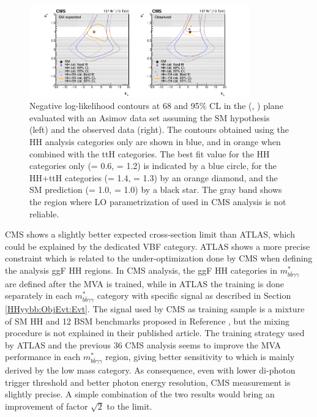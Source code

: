 \begin{figure}[htbp]
    \centering
    \includegraphics[width=0.85\textwidth]{Ch5/Img/CMS-HIG-19-018_kl_LH.pdf}
    \caption{Negative log-likelihood contours at 68 and 95\% CL in the (\kl, \kt) plane evaluated with an Asimov data set assuming the SM hypothesis (left) and the observed data (right). The contours obtained using the HH analysis categories only are shown in blue, and in orange when combined with the ttH categories. The best fit value for the HH categories only (\kl = 0.6, \kt = 1.2) is indicated by a blue circle, for the HH+ttH categories (\kl = 1.4, \kl = 1.3) by an orange diamond, and the SM prediction (\kl = 1.0, \kt = 1.0) by a black star. The gray band shows the region where LO parametrization of \kt used in CMS analysis is not reliable. }
    \label{fig:HHyybb:CMS:LH:2D}
\end{figure}

CMS shows a slightly better expected cross-section limit than ATLAS, which could be explained by the dedicated VBF category. ATLAS shows a more precise \kl constraint which is related to the under-optimization done by CMS when defining the analysis ggF HH regions. In CMS analysis, the ggF HH categories in $m_{b \bar{b} \gamma \gamma}^{*}$ are defined after the MVA is trained, while in ATLAS the training is done separately in each $m_{b \bar{b} \gamma \gamma}^{*}$ category with specific signal as described in Section \ref{HHyybb:ObjEvt:Evt}. The signal used by CMS as training sample is a mixture of SM HH and 12 BSM benchmarks proposed in Reference \cite{CMS_BSM}, but the mixing procedure is not explained in their published article. The training strategy used by ATLAS and the previous 36 \ifb CMS analysis seems to improve the MVA performance in each $m_{b \bar{b} \gamma \gamma}^{*}$ region, giving better sensitivity to \kl which is mainly derived by the low mass category. As consequence, even with lower di-photon trigger threshold and better photon energy resolution, CMS measurement is slightly precise. A simple combination of the two results would bring an improvement of factor $\sqrt{2}$ to the limit. \\

